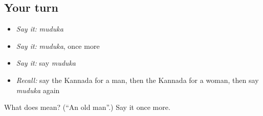 \subsection*{Your turn}
\begin{itemize}
\raggedright
  \item \emph{Say it:} \emph{muduka}
  \item \emph{Say it:} \emph{muduka}, once more
  \item \emph{Say it:} say \emph{muduka}
  \item \emph{Recall:} say the Kannada for a man, then the Kannada for a woman, then say \emph{muduka} again
\end{itemize}

\begin{tcolorbox}[breakable,colback=teal!4,colframe=teal!35!black,title={Before you move on}]
What does  mean? (\textquotedblleft{}An old man\textquotedblright{}.) Say it once more.
\end{tcolorbox}
